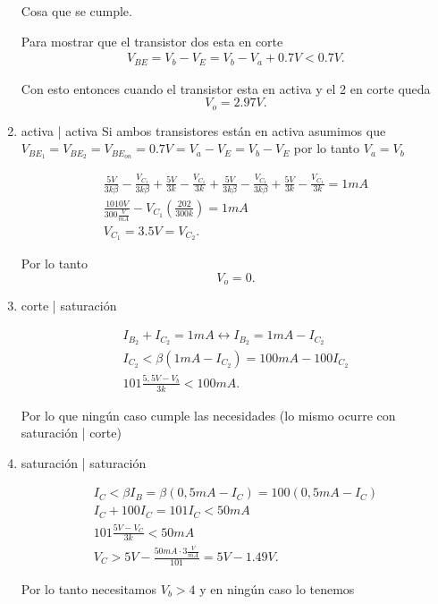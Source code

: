 \documentclass[12pt]{exam}
\begin{document}
\begin{enumerate}
	Cosa que se cumple.

	Para mostrar que el transistor dos esta en corte 
	\begin{align*}
	  V_{BE} = V_b - V_E = V_b - V_a + 0.7V < 0.7V
	.\end{align*}

	Con esto entonces cuando el transistor esta en activa y el 2 en corte queda
	\[
	V_o = 2.97V
	.\] 

      \item activa | activa
	Si ambos transistores están en activa asumimos que $V_{BE_1}=V_{BE_2}=V_{BE_{on}}=0.7V=V_a - V_E = V_b - V_E$ por lo tanto $V_a = V_b$

	 \begin{align*}
	  \frac{5V}{3k \beta} - \frac{V_{C_1}}{3k \beta} + \frac{5V}{3k} - \frac{V_{C_1}}{3k} + \frac{5V}{3k \beta} - \frac{V_{C_1}}{3k \beta} + \frac{5V}{3k} - \frac{V_{C_1}}{3k} = 1mA\\
	  \frac{1010 V}{300 \frac{V}{mA}} - V_{C_1}\left( \frac{202}{300k} \right) = 1mA\\
	  V_{C_1} = 3.5V = V_{C_2}
	.\end{align*}

	Por lo tanto \[
	V_o = 0
	.\] 

      \item corte | saturación

	\begin{align*}
	  I_{B_2} + I_{C_2} = 1mA \leftrightarrow I_{B_2}=1mA - I_{C_2}\\
	  I_{C_2} < \beta \left( 1mA - I_{C_2} \right) = 100 mA - 100 I_{C_2}\\
	  101 \frac{5,5V - V_b}{3k} < 100 mA
	.\end{align*}

	Por lo que ningún caso cumple las necesidades (lo mismo ocurre con saturación | corte)

      \item saturación | saturación

	\begin{align*}
	  I_C < \beta I_B = \beta \left( 0,5 mA - I_C \right) = 100\left( 0,5mA - I_C \right) \\
	  I_C + 100 I_C = 101 I_C < 50 mA\\
	  101 \frac{5V - V_C}{3k} < 50 mA\\
	  V_C > 5V - \frac{50 mA \cdot 3 \frac{V}{mA}}{101}= 5V - 1.49V
	.\end{align*}

	Por lo tanto necesitamos $V_b > 4$ y en ningún caso lo tenemos

    \end{enumerate}
\end{document}
